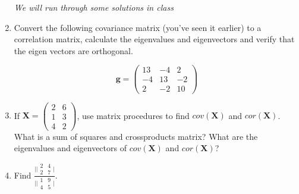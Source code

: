\documentclass{article}
\begin{document}
\begin{enumerate}
\textit{We will run through some solutions in class}

\item Convert the following covariance matrix (you've seen it earlier) to a correlation matrix, calculate the eigenvalues and eigenvectors and verify that the eigen vectors are orthogonal.

\begin{displaymath}
\boldsymbol{g} = \left( \begin{array}{rrr} 13 & -4 & 2\\ -4 & 13 & -2 \\ 2 & -2 & 10 \end{array} \right)
\end{displaymath}

\item If $\boldsymbol{X} = \left( \begin{array}{rr} 2 & 6\\ 1 & 3 \\ 4 & 2 \end{array} \right)$, use matrix procedures to find $cov(\boldsymbol{X})$ and $cor(\boldsymbol{X})$.   What is a sum of squares and crossproducts matrix?   What are the eigenvalues and eigenvectors of $cov(\boldsymbol{X})$ and $cor(\boldsymbol{X})$?

\item Find $\frac{\lvert| \begin{array}{rr} 2 & 4\\2 & 7 \end{array} \rvert}{\lvert| \begin{array}{rr} 1 & 9\\4 & 5 \end{array} \rvert}$.

\end{enumerate}
\end{document}
